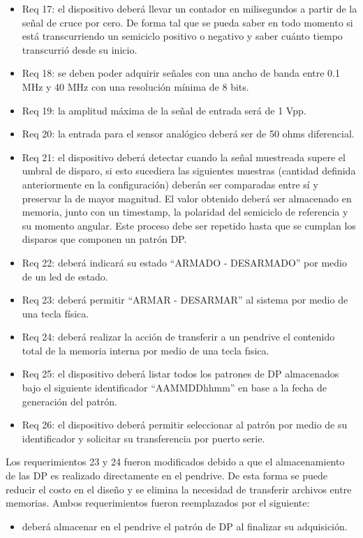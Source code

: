 \begin{itemize}
\item Req 17: el dispositivo deberá llevar un contador en milisegundos a partir de la señal de cruce por cero. De forma tal que se pueda saber en todo momento si está transcurriendo un semiciclo positivo o negativo y saber cuánto tiempo transcurrió desde su inicio.
\item Req 18: se deben poder adquirir señales con una ancho de banda entre 0.1 MHz y 40 MHz con una resolución mínima de 8 bits.
\item Req 19: la amplitud máxima de la señal de entrada será de 1 Vpp.
\item Req 20: la entrada para el sensor analógico deberá ser de 50 ohms diferencial.
\item Req 21: el dispositivo deberá detectar cuando la señal muestreada supere el umbral de disparo, si esto sucediera las siguientes muestras (cantidad definida anteriormente en la configuración) deberán ser comparadas entre sí y preservar la de mayor magnitud. El valor obtenido deberá ser almacenado en memoria, junto con un timestamp, la polaridad del semiciclo de referencia y su momento angular. Este proceso debe ser repetido hasta que se cumplan los disparos que componen un patrón DP.
\item Req 22: deberá indicará su estado “ARMADO - DESARMADO” por medio de un led de estado.
\item Req 23: \label{req:23}deberá permitir “ARMAR - DESARMAR” al sistema por medio de una tecla física.
\item Req 24: \label{req:24}deberá realizar la acción de transferir a un pendrive el contenido total de la memoria interna por medio de una tecla fısica.
\item Req 25: el dispositivo deberá listar todos los patrones de DP almacenados bajo el siguiente identificador “AAMMDDhhmm” en base a la fecha de generación del patrón.
\item Req 26: el dispositivo deberá permitir seleccionar al patrón por medio de su identificador y solicitar su transferencia por puerto serie.
\end{itemize}

Los requerimientos 23 y 24 fueron modificados debido a que el almacenamiento de las DP es realizado directamente en el pendrive. De esta forma se puede reducir el costo en el diseño y se elimina la necesidad de transferir archivos entre memorias. Ambos requerimientos fueron reemplazados por el siguiente:
\begin{itemize}
\item deberá almacenar en el pendrive el patrón de DP al finalizar su adquisición.
\end{itemize}


